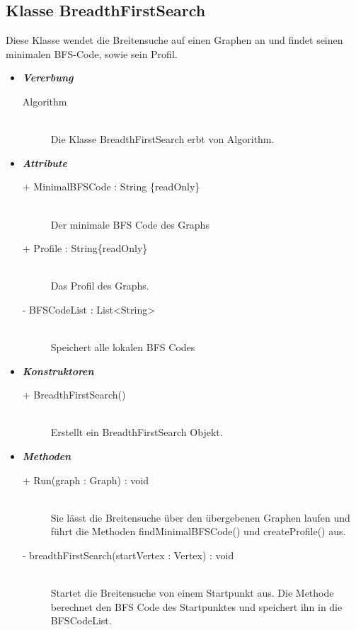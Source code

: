 \documentclass[13pt]{scrreprt}
\begin{document}
	\subsection{Klasse BreadthFirstSearch}
	
	Diese Klasse wendet die Breitensuche auf einen Graphen an und findet seinen minimalen BFS-Code, sowie sein Profil. 
	
	\begin{itemize}[label = {$\circ$}]
		\item {\large \textbf{\textit{Vererbung}}\par}
		\begin{description}
			\item[Algorithm] \hfill \\Die Klasse BreadthFirstSearch erbt von Algorithm.
		\end{description}
		\item {\large \textbf{\textit{Attribute}}\par}
		\begin{description}
			\item [+ MinimalBFSCode : String \{readOnly\}] \hfill \\Der minimale BFS Code des Graphs
			\item [+ Profile : String\lbrack\rbrack\lbrack\rbrack \{readOnly\}] \hfill \\Das Profil des Graphs.
			\item [- BFSCodeList : List<String>] \hfill \\Speichert alle lokalen BFS Codes
		\end{description}
		\item {\large \textbf{\textit{Konstruktoren}}\par}
		\begin{description}
			\item [+ BreadthFirstSearch()] \hfill \\Erstellt ein BreadthFirstSearch Objekt.
		\end{description}
		\item {\large \textbf{\textit{Methoden}}\par}
		\begin{description}
			\item [+ Run(graph : Graph) : void] \hfill \\Sie lässt die Breitensuche über den übergebenen Graphen laufen und führt die Methoden findMinimalBFSCode() und createProfile() aus.
			\item [- breadthFirstSearch(startVertex : Vertex) : void] \hfill \\ Startet die Breitensuche von einem Startpunkt aus. Die Methode berechnet den BFS Code des Startpunktes und speichert ihn in die BFSCodeList.

\end{description}
\end{itemize}
\end{document}

